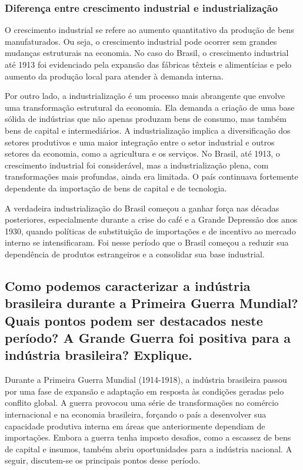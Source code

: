 \documentclass[a4paper,12pt]{article}[abntex2]
\begin{document}
\subsubsection{Diferença entre crescimento industrial e industrialização}

O crescimento industrial se refere ao aumento quantitativo da produção de bens manufaturados. Ou seja, o crescimento industrial pode ocorrer sem grandes mudanças estruturais na economia. No caso do Brasil, o crescimento industrial até 1913 foi evidenciado pela expansão das fábricas têxteis e alimentícias e pelo aumento da produção local para atender à demanda interna.

Por outro lado, a industrialização é um processo mais abrangente que envolve uma transformação estrutural da economia. Ela demanda a criação de uma base sólida de indústrias que não apenas produzam bens de consumo, mas também bens de capital e intermediários. A industrialização implica a diversificação dos setores produtivos e uma maior integração entre o setor industrial e outros setores da economia, como a agricultura e os serviços. No Brasil, até 1913, o crescimento industrial foi considerável, mas a industrialização plena, com transformações mais profundas, ainda era limitada. O país continuava fortemente dependente da importação de bens de capital e de tecnologia.

A verdadeira industrialização do Brasil começou a ganhar força nas décadas posteriores, especialmente durante a crise do café e a Grande Depressão dos anos 1930, quando políticas de substituição de importações e de incentivo ao mercado interno se intensificaram. Foi nesse período que o Brasil começou a reduzir sua dependência de produtos estrangeiros e a consolidar sua base industrial.

\subsection{\textbf{Como podemos caracterizar a indústria brasileira durante a Primeira Guerra Mundial? Quais pontos podem ser destacados neste período? A Grande Guerra foi positiva para a indústria brasileira? Explique.}}

Durante a Primeira Guerra Mundial (1914-1918), a indústria brasileira passou por uma fase de expansão e adaptação em resposta às condições geradas pelo conflito global. A guerra provocou uma série de transformações no comércio internacional e na economia brasileira, forçando o país a desenvolver sua capacidade produtiva interna em áreas que anteriormente dependiam de importações. Embora a guerra tenha imposto desafios, como a escassez de bens de capital e insumos, também abriu oportunidades para a indústria nacional. A seguir, discutem-se os principais pontos desse período.
\end{document}
